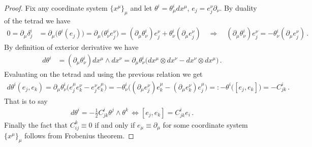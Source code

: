 \documentclass[../geometry_main.tex]{subfiles}
\begin{document}
\begin{proof}
Fix any coordinate system $\{x^\mu\}_\mu$ and let $\theta^i = \theta^i_\mu dx^\mu$, $e_j = e_j^\nu \partial_\nu$.
By duality of the tetrad we have
\begin{align}
    0= \partial_\mu \delta^i_j &= \partial_\mu \big(\theta^i (e_j) \big) = \partial_\mu\big(\theta^i_\nu e_j^\nu \big) = (\partial_\mu \theta^i_\nu) e_j^\nu + \theta^i_\nu (\partial_\mu e_j^\nu)
    \quad \Rightarrow\quad (\partial_\mu \theta^i_\nu) e_j^\nu =- \theta^i_\nu (\partial_\mu e_j^\nu)\,.
\end{align}
By definition of exterior derivative we have
\begin{align}
    d \theta^i &= (\partial_\mu \theta^i_\nu) dx^\mu \wedge dx^\nu = \partial_\mu \theta^i_\nu \Big(dx^\mu\otimes dx^\nu- dx^\nu \otimes dx^\mu \Big)\,.
\end{align}
Evaluating on the tetrad and using the previous relation we get
\begin{align}
    d\theta^i (e_j, e_k) 
    = \partial_\mu \theta^i_\nu \Big( e_j^\mu e_k^\nu - e_j^\nu e_k^\mu \Big) 
    = - \theta^i_\nu \Big( (\partial_\mu e_j^\nu) e_k^\mu - (\partial_\mu e_k^\nu) e_j^\mu \Big) 
     =: - \theta^i \big( [e_j, e_k]\big) = - C^i_{jk}\,.
\end{align}
That is to say
\begin{align}
    d\theta^i = - \frac{1}{2} C^i_{jk} \theta^j \wedge \theta^k\, \Leftrightarrow [e_j, e_k] = C^i_{jk} e_i\,.
\end{align}
Finally the fact that $C_{ij}^k \equiv 0$ if and only if $e_\mu\equiv \partial_\mu$ for some coordinate system $\{x^\mu\}_\mu$ follows from Frobenius theorem.
%
\end{proof}
\end{document}
